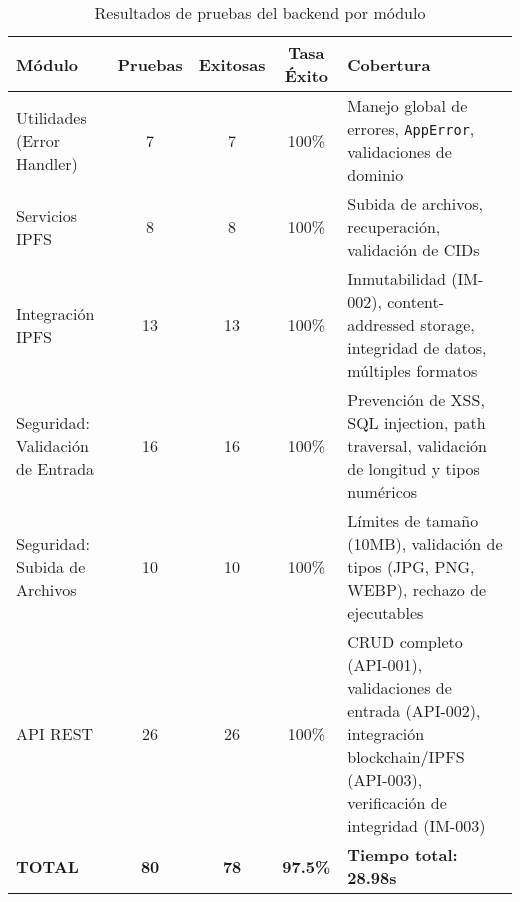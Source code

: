 \begin{table}[htbp]
\centering
\caption{Resultados de pruebas del backend por módulo}
\label{tab:resultados_backend}
\begin{adjustbox}{max width=\textwidth}
\begin{tabular}{@{}lcccp{5cm}@{}}
\toprule
\textbf{Módulo} & \textbf{Pruebas} & \textbf{Exitosas} & \textbf{Tasa Éxito} & \textbf{Cobertura} \\
\midrule

Utilidades (Error Handler) & 7 & 7 & 100\% &
Manejo global de errores, \texttt{AppError}, validaciones de dominio \\
\addlinespace

Servicios IPFS & 8 & 8 & 100\% &
Subida de archivos, recuperación, validación de CIDs \\
\addlinespace

Integración IPFS & 13 & 13 & 100\% &
Inmutabilidad (IM-002), content-addressed storage, integridad de datos, múltiples formatos \\
\addlinespace

Seguridad: Validación de Entrada & 16 & 16 & 100\% &
Prevención de XSS, SQL injection, path traversal, validación de longitud y tipos numéricos \\
\addlinespace

Seguridad: Subida de Archivos & 10 & 10 & 100\% &
Límites de tamaño (10MB), validación de tipos (JPG, PNG, WEBP), rechazo de ejecutables \\
\addlinespace

API REST & 26 & 26 & 100\% &
CRUD completo (API-001), validaciones de entrada (API-002), integración blockchain/IPFS (API-003), verificación de integridad (IM-003) \\
\addlinespace

\midrule
\textbf{TOTAL} & \textbf{80} & \textbf{78} & \textbf{97.5\%} &
\textbf{Tiempo total: 28.98s} \\
\bottomrule
\end{tabular}
\end{adjustbox}
\end{table}
